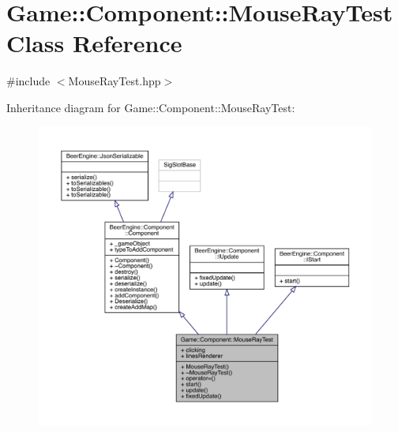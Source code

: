 \hypertarget{class_game_1_1_component_1_1_mouse_ray_test}{}\section{Game\+:\+:Component\+:\+:Mouse\+Ray\+Test Class Reference}
\label{class_game_1_1_component_1_1_mouse_ray_test}


{\ttfamily \#include $<$Mouse\+Ray\+Test.\+hpp$>$}



Inheritance diagram for Game\+:\+:Component\+:\+:Mouse\+Ray\+Test\+:\nopagebreak
\begin{figure}[H]
\begin{center}
\leavevmode
\includegraphics[width=350pt]{class_game_1_1_component_1_1_mouse_ray_test__inherit__graph}
\end{center}
\end{figure}


